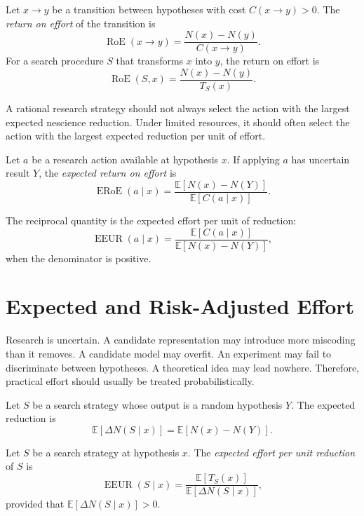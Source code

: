 \begin{definition}
Let \(x\to y\) be a transition between hypotheses with cost \(C(x\to y)>0\). The \emph{return on effort} of the transition is
\[
\operatorname{RoE}(x\to y)
=
\frac{N(x)-N(y)}{C(x\to y)}.
\]
For a search procedure \(S\) that transforms \(x\) into \(y\), the return on effort is
\[
\operatorname{RoE}(S,x)
=
\frac{N(x)-N(y)}{T_S(x)}.
\]
\end{definition}

A rational research strategy should not always select the action with the largest expected nescience reduction. Under limited resources, it should often select the action with the largest expected reduction per unit of effort.

\begin{definition}
Let \(a\) be a research action available at hypothesis \(x\). If applying \(a\) has uncertain result \(Y\), the \emph{expected return on effort} is
\[
\operatorname{ERoE}(a\mid x)
=
\frac{\mathbb{E}[N(x)-N(Y)]}{\mathbb{E}[C(a\mid x)]}.
\]
\end{definition}

The reciprocal quantity is the expected effort per unit of reduction:
\[
\operatorname{EEUR}(a\mid x)
=
\frac{\mathbb{E}[C(a\mid x)]}{\mathbb{E}[N(x)-N(Y)]},
\]
when the denominator is positive.

\section{Expected and Risk-Adjusted Effort}
\label{sec:expected_and_risk_adjusted_effort}

Research is uncertain. A candidate representation may introduce more miscoding than it removes. A candidate model may overfit. An experiment may fail to discriminate between hypotheses. A theoretical idea may lead nowhere. Therefore, practical effort should usually be treated probabilistically.

Let \(S\) be a search strategy whose output is a random hypothesis \(Y\). The expected reduction is
\[
\mathbb{E}[\Delta N(S\mid x)]
=
\mathbb{E}[N(x)-N(Y)].
\]

\begin{definition}
Let \(S\) be a search strategy at hypothesis \(x\). The \emph{expected effort per unit reduction} of \(S\) is
\[
\operatorname{EEUR}(S\mid x)
=
\frac{\mathbb{E}[T_S(x)]}{\mathbb{E}[\Delta N(S\mid x)]},
\]
provided that \(\mathbb{E}[\Delta N(S\mid x)]>0\).
\end{definition}

